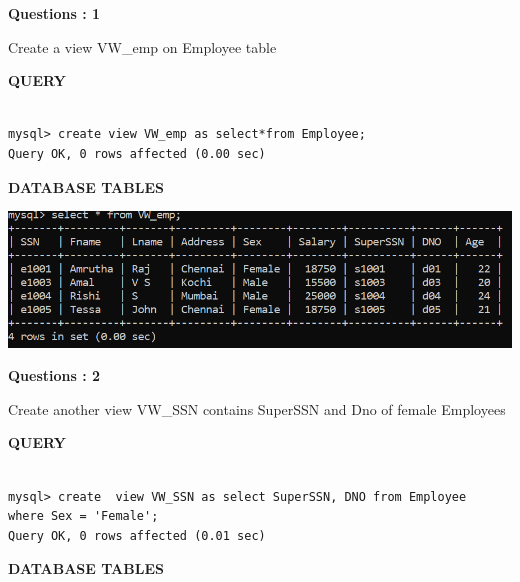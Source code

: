 \documentclass[a4paper,12pt]{report}
\begin{document}
\begin{flushleft}
    \textbf{Questions : 1}
\end{flushleft}
Create a view VW\_emp on Employee table
	\begin{flushleft}
		\textbf{QUERY }
	\end{flushleft}
 \begin{verbatim}
 
mysql> create view VW_emp as select*from Employee;
Query OK, 0 rows affected (0.00 sec)

\end{verbatim}
\begin{flushleft}
		\textbf{DATABASE TABLES} 
\end{flushleft} 

\includegraphics[scale=0.5]{Screenshot (478).png}
\begin{flushleft}
    \textbf{Questions : 2}
\end{flushleft}
Create another view VW\_SSN contains SuperSSN and Dno of female Employees
	\begin{flushleft}
		\textbf{QUERY }
	\end{flushleft}
 \begin{verbatim}
 
mysql> create  view VW_SSN as select SuperSSN, DNO from Employee 
where Sex = 'Female';
Query OK, 0 rows affected (0.01 sec)

\end{verbatim}
\begin{flushleft}
		\textbf{DATABASE TABLES} 
\end{flushleft} 
\end{document}
